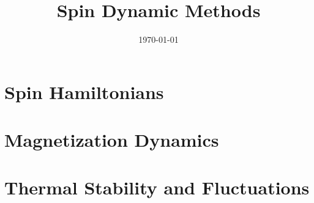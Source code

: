 \documentclass[11pt]{article}
\title{Spin Dynamic Methods}
\author{}
\date{\today}
\numberwithin{equation}{section}
\begin{document}
\maketitle
\tableofcontents



\section{Spin Hamiltonians}


\section{Magnetization Dynamics}


\section{Thermal Stability and Fluctuations}



\end{document}
